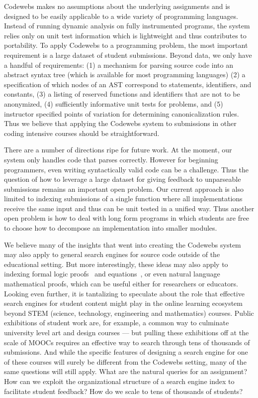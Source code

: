 Codewebs makes no assumptions about the underlying assignments and is designed to be easily applicable to a 
wide variety of programming languages.
Instead of running dynamic analysis on fully instrumented programs, the system relies only on unit test information
which is lightweight and thus contributes to portability.
To apply Codewebs to a programming problem, the most important requirement is a large dataset of student submissions.
Beyond data, we only have a handful of requirements:
(1) a mechanism for parsing source code into an abstract syntax tree (which is available for most programming languages)
(2) a specification of which nodes of an AST correspond to statements, identifiers, and constants, 
(3) a listing of reserved functions and identifiers that are not to be anonymized, 
(4) sufficiently informative unit tests for problems, and 
(5) instructor specified points of variation for determining canonicalization rules.  
Thus we believe that applying the Codewebs system to submissions in other coding intensive courses should be straightforward.

There are a number of directions ripe for future work.
At the moment, our system only handles code that parses correctly.  However for beginning programmers,
even writing syntactically valid code can be a challenge.  Thus the question of how to leverage a large
dataset for giving feedback to unparseable submissions remains an important open problem.  
Our current approach is also limited to indexing submissions of a single function where all implementations receive
the same input and thus can be unit tested in a unified way.
Thus another open problem is how to deal with long form programs in which
students are free to choose how to decompose an implementation into smaller modules.

We believe  many of the insights that went into creating the Codewebs system
may also apply to general search engines for source code outside of the educational setting. 
But more interestingly, these ideas may also apply to indexing formal logic proofs~\cite{fast13} and equations~\cite{kohlhase06}, or even 
natural language mathematical proofs, which can be useful either for researchers or educators.
Looking even further, it is tantalizing to speculate about the role that effective search engines for student content
 might play in the online learning ecosystem beyond STEM (science, technology, engineering and mathematics) courses. 
Public exhibitions of student work are, for example, a common way to culminate university level art and design courses --- but 
pulling these exhibitions off at the scale of MOOCs requires an effective way to search through tens of thousands of submissions.
And while the specific features of designing a search engine for one of these courses will surely be different from the Codewebs
setting,  many of the same questions will still apply.  
What are the natural queries for an assignment?
How can we exploit the organizational structure of a search engine index to facilitate student feedback?
How do we scale to tens of thousands of students?



